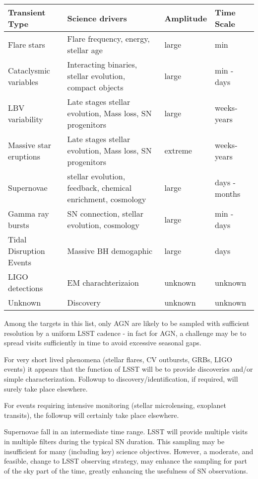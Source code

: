 \begin{center}
\begin{tabular}{| p{3cm} | p{8cm} | l | l |}
\hline Transient Type & Science drivers & Amplitude & Time Scale\\
\hline
Flare stars & Flare frequency, energy, stellar age & large & min \\

Cataclysmic variables  & Interacting binaries, stellar evolution, compact objects & large & min - days\\

LBV variability & Late stages stellar evolution, Mass loss, SN progenitors & large & weeks-years\\

Massive star eruptions &  Late stages stellar evolution, Mass loss, SN progenitors & extreme &  weeks-years\\

Supernovae & stellar evolution, feedback, chemical enrichment, cosmology & large & days - months \\

Gamma ray bursts & SN connection, stellar evolution, cosmology & large & min - days\\

Tidal Disruption Events & Massive BH demogaphic  & large & days\\

LIGO detections &  EM charachterizaion & unknown & unknown\\

Unknown  & Discovery & unknown & unknown\\
 \hline \end{tabular}
 \end{center}

Among the targets in this list, only AGN are likely to be sampled with sufficient resolution by a uniform LSST cadence - in fact for AGN, a challenge may be to spread visits sufficiently in time to avoid excessive seasonal gaps.

For very short lived phenomena (stellar flares, CV outbursts, GRBs, LIGO events) it appears that the function of LSST will be to provide discoveries and/or simple characterization.  Followup to discovery/identification, if required, will surely take place elsewhere.

For events requiring intensive monitoring (stellar microlensing, exoplanet transits), the followup will certainly take place elsewhere.

Supernovae fall in an intermediate time range.  LSST will provide multiple visits in multiple filters during the typical SN duration.  This sampling may be insufficient for many (including key) science objectives.  However, a moderate, and feasible, change to LSST observing strategy, may enhance the sampling for part of the sky part of the time, greatly enhancing the usefulness of SN observations.

